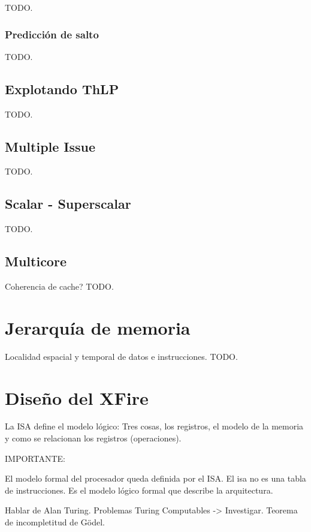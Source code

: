 TODO.

\subsubsection{Predicción de salto}
\label{subsubsec:optimizations-ilp-branch_prediction}

TODO.

\subsection{Explotando ThLP}
\label{subsec:optimizations-thlp}

TODO.











\subsection{Multiple Issue}
\label{subsec:optimizations-multiple_issue}

TODO.

\subsection{Scalar - Superscalar}
\label{subsec:optimizations-scalar_superscalar}

TODO.

\subsection{Multicore}
\label{subsec:optimizations-multicore}

Coherencia de cache?
TODO.

\section{Jerarquía de memoria}
\label{sec:mem_hierarchy}

Localidad espacial y temporal de datos e instrucciones. TODO.

\section{Diseño del XFire}

La ISA define el modelo lógico: Tres cosas, los registros, el modelo de la
memoria y como se relacionan los registros (operaciones).



IMPORTANTE:

El modelo formal del procesador queda definida por el ISA. El isa no es una tabla de instrucciones. Es el modelo lógico formal que describe la arquitectura.

Hablar de Alan Turing. Problemas Turing Computables -> Investigar. Teorema de incompletitud de Gödel.

